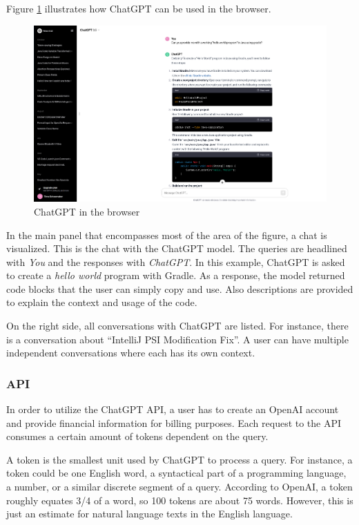 Figure \ref{fig:chatgpt_browser} illustrates how ChatGPT can be used in the browser.
\begin{figure}
    \centering
\includegraphics[width=\columnwidth]{figures/chapter2/chatgpt_browser.png}
    \caption{ChatGPT in the browser}
    \label{fig:chatgpt_browser}
\end{figure}
In the main panel that encompasses most of the area of the figure, a chat is visualized. This is the chat with the ChatGPT model. The queries are headlined with \textit{You} and the responses with \textit{ChatGPT}. In this example, ChatGPT is asked to create a \textit{hello world} program with Gradle. As a response, the model returned code blocks that the user can simply copy and use. Also descriptions are provided to explain the context and usage of the code.

On the right side, all conversations with ChatGPT are listed. For instance, there is a conversation about \enquote{IntelliJ PSI Modification Fix}. A user can have multiple independent conversations where each has its own context. 

\subsubsection{API}
In order to utilize the ChatGPT \ac{API}, a user has to create an OpenAI account and provide financial information for billing purposes. Each request to the API consumes a certain amount of tokens dependent on the query. 

A token is the smallest unit used by ChatGPT to process a query. For instance, a token could be one English word, a syntactical part of a programming language, a number, or a similar discrete segment of a query. According to OpenAI, a token roughly equates 3/4 of a word, so 100 tokens are about 75 words. However, this is just an estimate for natural language texts in the English language. 

